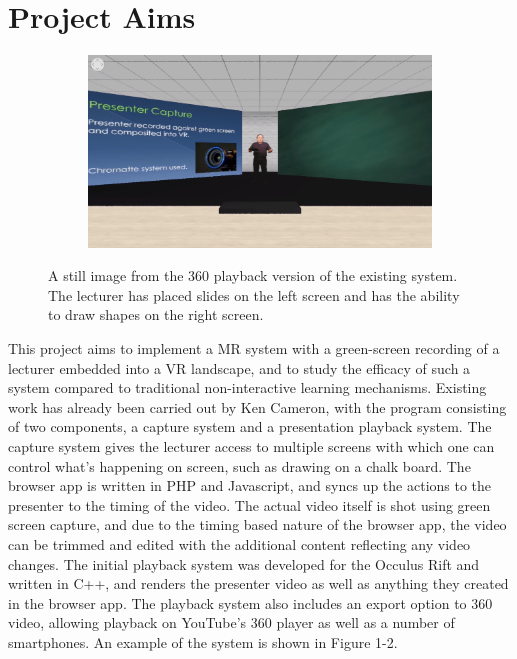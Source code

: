 \documentclass[11pt]{report}
\begin{document}
\section{Project Aims}
\begin{figure}
\centering
\begin{subfigure}[b]{0.7\textwidth}  
\includegraphics[width=\textwidth]{MRpresentation.png}
\end{subfigure}
\caption{A still image from the 360 playback version of the existing system. The lecturer has placed slides on the left screen and has the ability to draw shapes on the right screen.}
\end{figure}
This project aims to implement a MR system with a green-screen recording of a lecturer embedded into a VR landscape, and to study the efficacy of such a system compared to traditional non-interactive learning mechanisms. Existing work has already been carried out by Ken Cameron, with the program consisting of two components, a capture system and a presentation playback system. The capture system gives the lecturer access to multiple screens with which one can control what's happening on screen, such as drawing on a chalk board. The browser app is written in PHP and Javascript, and syncs up the actions to the presenter to the timing of the video. The actual video itself is shot using green screen capture, and due to the timing based nature of the browser app, the video can be trimmed and edited with the additional content reflecting any video changes. The initial playback system was developed for the Occulus Rift and written in C++, and renders the presenter video as well as anything they created in the browser app. The playback system also includes an export option to 360 video, allowing playback on YouTube's 360 player as well as a number of smartphones. An example of the system is shown in Figure 1-2.\\~\\
\end{document}
